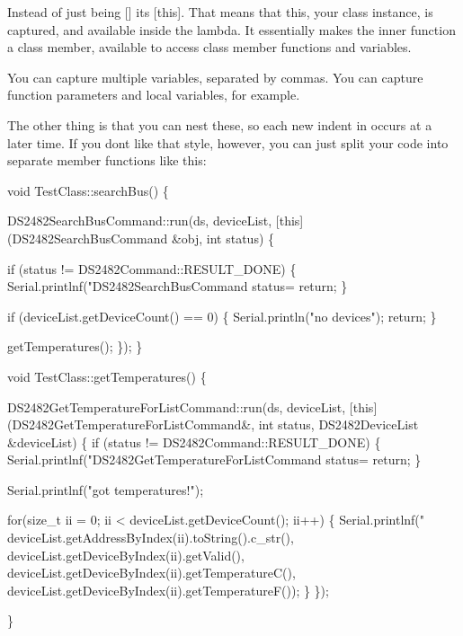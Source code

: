 Instead of just being {\ttfamily \mbox{[}\mbox{]}} it\textquotesingle{}s {\ttfamily \mbox{[}this\mbox{]}}. That means that {\ttfamily this}, your class instance, is captured, and available inside the lambda. It essentially makes the inner function a class member, available to access class member functions and variables.

You can capture multiple variables, separated by commas. You can capture function parameters and local variables, for example.

The other thing is that you can nest these, so each new indent in occurs at a later time. If you don\textquotesingle{}t like that style, however, you can just split your code into separate member functions like this\+:


\begin{DoxyCode}
void TestClass::searchBus() \{

    DS2482SearchBusCommand::run(ds, deviceList, [this](DS2482SearchBusCommand &obj, int status) \{

        if (status != DS2482Command::RESULT\_DONE) \{
            Serial.printlnf("DS2482SearchBusCommand status=%
            return;
        \}

        if (deviceList.getDeviceCount() == 0) \{
            Serial.println("no devices");
            return;
        \}

        getTemperatures();
    \});
\}

void TestClass::getTemperatures() \{

    DS2482GetTemperatureForListCommand::run(ds, deviceList, [this](DS2482GetTemperatureForListCommand&, int
       status, DS2482DeviceList &deviceList) \{
        if (status != DS2482Command::RESULT\_DONE) \{
            Serial.printlnf("DS2482GetTemperatureForListCommand status=%
            return;
        \}

        Serial.printlnf("got temperatures!");

        for(size\_t ii = 0; ii < deviceList.getDeviceCount(); ii++) \{
            Serial.printlnf("%
                    deviceList.getAddressByIndex(ii).toString().c\_str(),
                    deviceList.getDeviceByIndex(ii).getValid(),
                    deviceList.getDeviceByIndex(ii).getTemperatureC(),
                    deviceList.getDeviceByIndex(ii).getTemperatureF());
        \}
    \});

\}
\end{DoxyCode}


